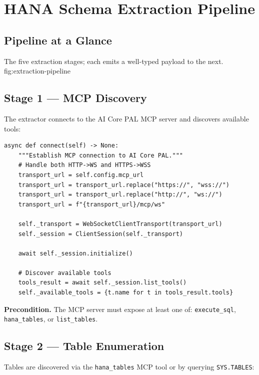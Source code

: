 \chapter{HANA Schema Extraction Pipeline}
\label{chap:extraction}\label{sim:chap:extraction}

\section{Pipeline at a Glance}

%
  {The five extraction stages; each emits a well-typed payload to the next.}%
  {fig:extraction-pipeline}

\section{Stage 1 --- MCP Discovery}

The extractor connects to the AI Core PAL MCP server and discovers available tools:

\begin{lstlisting}[language=jsonx,caption={MCP connection (hana\_schema\_extractor.py, lines 45--60)}]
async def connect(self) -> None:
    """Establish MCP connection to AI Core PAL."""
    # Handle both HTTP->WS and HTTPS->WSS
    transport_url = self.config.mcp_url
    transport_url = transport_url.replace("https://", "wss://")
    transport_url = transport_url.replace("http://", "ws://")
    transport_url = f"{transport_url}/mcp/ws"
    
    self._transport = WebSocketClientTransport(transport_url)
    self._session = ClientSession(self._transport)
    
    await self._session.initialize()
    
    # Discover available tools
    tools_result = await self._session.list_tools()
    self._available_tools = {t.name for t in tools_result.tools}
\end{lstlisting}

\textbf{Precondition.} The MCP server must expose at least one of: \texttt{execute\_sql},
\texttt{hana\_tables}, or \texttt{list\_tables}.

\section{Stage 2 --- Table Enumeration}

Tables are discovered via the \texttt{hana\_tables} MCP tool or by querying
\texttt{SYS.TABLES}:

